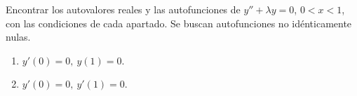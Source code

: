 Encontrar los autovalores reales y las autofunciones de \(y''+\lambda y=0\),
\(0<x<1\), con las condiciones de cada apartado. Se buscan autofunciones no idénticamente nulas.

\begin{enumerate}[label=(\alph*),ref=\alph*,leftmargin=*]
\item \(y'(0)=0,\ y(1)=0\).
\item \(y'(0)=0,\ y'(1)=0\).
\end{enumerate}
